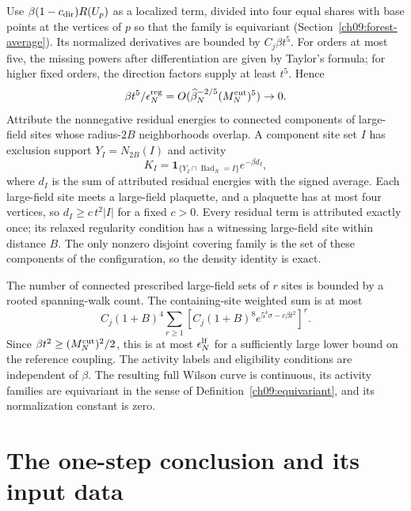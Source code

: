 Use $\beta(1-c_{\rm dir})R(U_p)$ as a localized term, divided into four equal shares with base points at the vertices of $p$ so that the family is equivariant (Section~\ref{ch09:forest-average}).
Its normalized derivatives are bounded by $C_j\beta t^5$.
For orders at most five, the missing powers after
differentiation are given by Taylor's formula; for
higher fixed orders, the direction factors supply at
least $t^5$. Hence
\[
 \beta t^5/\epsilon_N^{\rm reg}
              =O(\widehat\beta_N^{-2/5}(M_N^{\rm cut})^5)\to0 .
\]
Attribute the nonnegative residual energies to connected
components of large-field sites whose radius-$2B$ neighborhoods
overlap. A component site set $I$ has exclusion support
$Y_I=N_{2B}(I)$ and activity
\[
 K_I=\mathbf1_{\{Y_I\cap\operatorname{Bad}_N=I\}}
                         e^{-\beta d_I},
\]
where $d_I$ is the sum of attributed residual energies with
the signed average. Each large-field site meets a large-field plaquette,
and a plaquette has at most four vertices, so
$d_I\ge c\,t^2|I|$ for a fixed $c>0$.
Every residual term is attributed exactly once; its relaxed regularity condition has a witnessing large-field site within distance $B$.
The only nonzero disjoint covering family is the set
of these components of the configuration, so the density identity is exact.

The number of connected prescribed large-field sets of $r$ sites is bounded
by a rooted spanning-walk count. The containing-site
weighted sum is at most
\[
 C_j(1+B)^4\sum_{r\ge1}
       \left[C_j(1+B)^8e^{5^4\sigma-c\beta t^2}\right]^r .
\]
Since $\beta t^2\ge(M_N^{\rm cut})^2/2$, this is at most
$\epsilon_N^{\rm lf}$ for a sufficiently large lower bound on the reference coupling.
The activity labels and eligibility conditions are independent of $\beta$.
The resulting full Wilson curve is continuous, its activity families are equivariant in the sense of Definition~\ref{ch09:equivariant}, and its
normalization constant is zero.

\section{The one-step conclusion and its input data}
\label{ch09:step}

